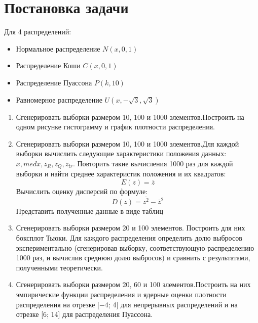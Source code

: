 \documentclass[a4paper]{article}
\begin{document}
\section {Постановка задачи}
\noindent Для 4 распределений:
\begin{itemize}
	\item Нормальное распределение $N(x, 0, 1)$ 
	\item Распределение Коши  $C(x, 0, 1)$
	\item Распределение Пуассона $P(k, 10)$
	\item Равномерное распределение $U(x, -\sqrt{3}, \sqrt{3})$
\end{itemize}
\begin{enumerate}
    \item Сгенерировать выборки размером 10, 100 и 1000 элементов.\newline Построить на одном рисунке гистограмму и график плотности распределения.
    \item Сгенерировать выборки размером 10, 100 и 1000 элементов.\newline Для каждой выборки вычислить следующие характеристики положения данных:\newline $\overline{x}, med x, z_R, z_Q, z_{tr}$. Повторить такие вычисления 1000 раз для каждой выборки и найти среднее характеристик положения и их квадратов:
        \begin{equation}
            E(z) = \overline{z}
        \end{equation}
        \newline Вычислить оценку дисперсий по формуле:
        \begin{equation}
            D(z) = \overline{z^2} - \overline{z}^2
        \end{equation}
        \newline Представить полученные данные в виде таблиц
    \item Сгенерировать выборки размером 20 и 100 элементов.
        \newline Построить для них боксплот Тьюки.
        Для каждого распределения определить долю выбросов экспериментально (сгенерировав выборку, соответствующую распределению 1000
        раз, и вычислив среднюю долю выбросов) и сравнить с результатами,
        полученными теоретически.
    \item Сгенерировать выборки размером 20, 60 и 100 элементов.\newline Построить на них эмпирические функции распределения и ядерные
    оценки плотности распределения на отрезке [−4; 4] для непрерывных распределений и на отрезке [6; 14] для распределения Пуассона.
\end{enumerate}
\end{document}
